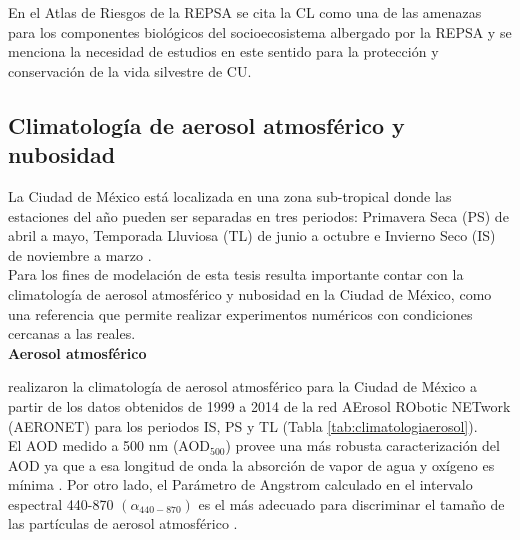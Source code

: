 En el Atlas de Riesgos de la REPSA \citep{AtlasREPSA} se cita la CL como una de las amenazas para los componentes biológicos del socioecosistema albergado por la REPSA y se menciona la necesidad de estudios en este sentido para la protección y conservación de la vida silvestre de CU.\\


\subsection{Climatología de aerosol atmosférico y nubosidad}
\label{subsec:climatologia}

La Ciudad de México está localizada en una zona sub-tropical donde las estaciones del año pueden ser separadas en tres periodos: Primavera Seca (PS) de abril a mayo, Temporada Lluviosa (TL) de junio a octubre e Invierno Seco (IS) de noviembre a marzo \citep{Jauregui2002}.\\

Para los fines de modelación de esta tesis resulta importante contar con la climatología de aerosol atmosférico y nubosidad en la Ciudad de México, como una referencia que permite realizar experimentos numéricos con condiciones cercanas a las reales.\\

\textbf{Aerosol atmosférico}

\cite{Carabali2017} realizaron la climatología de aerosol atmosférico para la Ciudad de México a partir de los datos obtenidos de 1999 a 2014 de la red AErosol RObotic NETwork (AERONET) para los periodos IS, PS y TL  (Tabla \ref{tab:climatologiaerosol}).\\

El AOD medido a 500 nm (AOD$_{500}$) provee una más robusta caracterización del AOD ya que a esa longitud de onda la absorción de vapor de agua y oxígeno es mínima \citep{Kanniah2009}. Por otro lado, el Parámetro de Angstrom calculado en el intervalo espectral 440-870 $(\alpha_{440-870})$ es el más adecuado para discriminar el tamaño de las partículas de aerosol atmosférico \citep{Kaskaoutis2007}.

\begin{table}[htb]
\centering
\caption{Climatología de aerosol atmosférico en la Ciudad de México \citep{Carabali2017}}
\label{tab:climatologiaerosol}
\end{table}

